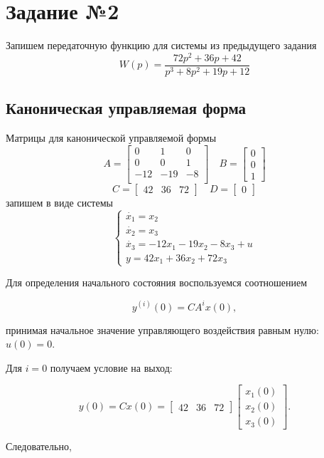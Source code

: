 \documentclass[a4paper, 12pt]{article}
\begin{document}
\newpage
\section{Задание №2}

Запишем передаточную функцию для системы из предыдущего задания
\[
W(p) = \frac{72p^2 + 36p + 42}{p^3 + 8p^2 + 19p +12}
\]

\subsection{Каноническая управляемая форма}
Матрицы для канонической управляемой формы
\[
A = \begin{bmatrix}
    0&1&0\\
    0&0&1\\
    -12&-19&-8\\
\end{bmatrix} \quad B = 
\begin{bmatrix}
    0\\0\\1    
\end{bmatrix}
\]
\[
C = \begin{bmatrix}
    42&36&72
\end{bmatrix} \quad D=\begin{bmatrix}
    0
\end{bmatrix}
\]
запишем в виде системы
\[
\begin{cases}
    \dot{x_1} = x_2\\
    \dot{x_2} = x_3\\
    \dot{x_3} = -12x_1 - 19x_2 - 8x_3 + u\\
    y = 42x_1 + 36x_2 + 72x_3
\end{cases}
\]

Для определения начального состояния воспользуемся соотношением

\[
y^{(i)}(0) = CA^i x(0),
\]

принимая начальное значение управляющего воздействия равным нулю:
\(u(0)=0\).

Для $i=0$ получаем условие на выход:

\[
y(0) = Cx(0)
=
\begin{bmatrix}
42 & 36 & 72
\end{bmatrix}
\begin{bmatrix}
x_1(0)\\
x_2(0)\\
x_3(0)
\end{bmatrix}.
\]

Следовательно,
\end{document}
